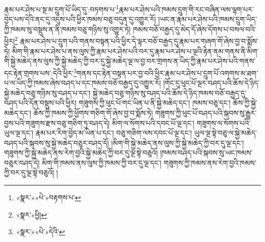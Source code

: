 རྣམ་པར་ཤེས་པ་སྔ་མ་དྲུག་པོ་ཡིད་དུ་:བཏགས་པ་\footnote{«སྣར་»«པེ་»བརྟགས་པ་}རྣམ་པར་ཤེས་པའི་ཁམས་དྲུག་གི་རང་བཞིན་ལས་ལྷག་པར་བྱེད་པས་དེའི་ནང་དུ་འདུས་པའི་ཕྱིར་ཁམས་བཅུ་བདུན་དུ་འགྱུར་རོ། །ཡང་ན་རྣམ་པར་ཤེས་པའི་ཁམས་དྲུག་ཡིད་ཀྱི་ཁམས་སུ་བསྡུས་ན་ནི་ཁམས་བཅུ་གཉིས་སུ་འགྱུར་ཏེ། ཁམས་བཅོ་བརྒྱད་དུ་མེད་དོ་ཞེས་དོགས་པ་བསལ་བའི་ཕྱིར།\footnote{«སྣར་»ཕྱི།} རྣམ་པར་ཤེས་པ་དྲུག་པའི་གནས་བསྟན་པའི་ཕྱིར་དེ་ལྟར་བཅོ་བརྒྱད་དུ་རྣམ་པར་གཞག་གོ་ཞེས་བྱ་བ་སྨོས་ཏེ། མིག་གི་རྣམ་པར་ཤེས་པ་ནས་ལུས་ཀྱི་རྣམ་པར་ཤེས་པའི་བར་དུ་རྣམ་པར་ཤེས་པ་ལྔའི་རྟེན་ནམ་གནས་ནི་མིག་གི་སྐྱེ་མཆེད་ནས་ལུས་ཀྱི་སྐྱེ་མཆེད་ཀྱི་བར་དུ་སྐྱེ་མཆེད་ལྔ་ལ་བྱ་བར་གྲགས་ན་ཡིད་ཀྱི་རྣམ་པར་ཤེས་པའི་གནས་དང་རྟེན་གྲགས་པས་:དེའི་ཕྱིར་\footnote{«སྣར་»«པེ་»དེའི་}གནས་དང་རྟེན་བསྟན་པར་བྱ་བའི་ཕྱིར་རྣམ་པར་ཤེས་པ་དྲུག་པོ་འགགས་མ་ཐག་པ་ལ་ཡིད་ཀྱི་ཁམས་ཞེས་བཤད་པ་དང་ཁམས་བཅོ་བརྒྱད་དུ་འགྱུར་རོ། །གོང་དུ་ཕུང་པོ་ལྔར་བཤད་པའི་ཆོས་དེ་ཉིད་སྐྱེ་མཆེད་བཅུ་གཉིས་སུ་བཤད་པ་དང་། སྐྱེ་མཆེད་བཅུ་གཉིས་སུ་བཤད་པའི་ཆོས་དེ་ཉིད་ཁམས་བཅོ་བརྒྱད་དུ་བཤད་པའི་དོན་བསྡུས་པའི་ཕྱིར། གཟུགས་ཀྱི་ཕུང་པོ་གང་ཡིན་པ་ནི་སྐྱེ་མཆེད་དང་། ཁམས་བཅུ་དང་། ཆོས་ཀྱི་སྐྱེ་མཆེད་དང་། ཆོས་ཀྱི་ཁམས་ཀྱི་ཕྱོགས་གཅིག་གོ་ཞེས་བྱ་བ་སྨོས་ཏེ། གཟུགས་ཀྱི་ཕུང་པོ་བཤད་པའི་སྐབས་སུ་རྒྱུར་བྱས་པའི་གཟུགས་རྫས་བཅུ་གཅིག་ཏུ་བཤད་དེ། མིག་ལ་སོགས་པའི་དབང་པོ་ལྔ་དང་། གཟུགས་ལ་སོགས་པའི་ཡུལ་ལྔ་དང་། རྣམ་པར་རིག་བྱེད་མ་ཡིན་པ་དང་། བཅུ་གཅིག་ལས་དབང་པོ་ལྔ་དང་། ཡུལ་ལྔ་སྟེ་བཅུ་ལ་སྐྱེ་མཆེད་བཤད་པའི་སྐབས་སུ་སྐྱེ་མཆེད་བཅུར་བཤད་དོ། །མིག་གི་སྐྱེ་མཆེད་ནས་ལུས་ཀྱི་སྐྱེ་མཆེད་ཀྱི་བར་དུ་ལྔ་དང་། གཟུགས་ཀྱི་སྐྱེ་མཆེད་ནས་རེག་བྱའི་སྐྱེ་མཆེད་ཀྱི་བར་དུ་ལྔ་སྟེ་བཅུའོ། །ཁམས་བཤད་པའི་སྐབས་སུ་ཡང་ཁམས་བཅུར་བཤད་དེ། མིག་གི་ཁམས་ནས་ལུས་ཀྱི་ཁམས་ཀྱི་བར་དུ་ལྔ་དང་། གཟུགས་ཀྱི་ཁམས་ནས་རེག་བྱའི་ཁམས་ཀྱི་བར་དུ་ལྔ་སྟེ་བཅུའོ། །
